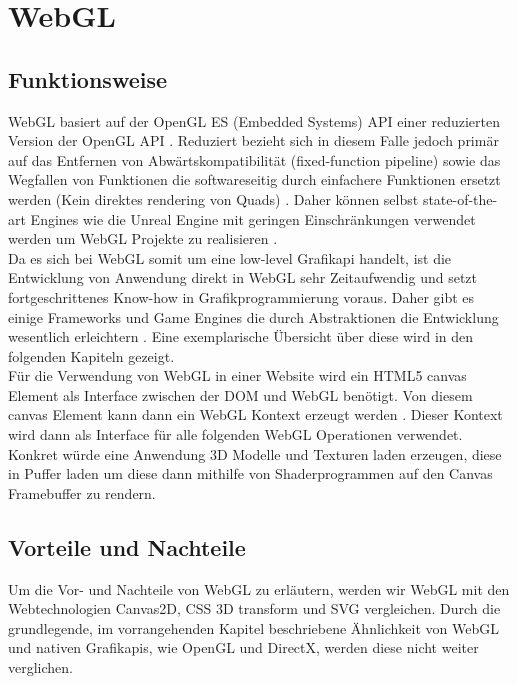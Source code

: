 \section{WebGL}
\subsection{Funktionsweise}
WebGL basiert auf der OpenGL ES (Embedded Systems) API \cite{parisi2012webgl} einer reduzierten Version der OpenGL API \cite{KhronosGLES}. Reduziert bezieht sich in diesem Falle jedoch primär auf das Entfernen von Abwärtskompatibilität (\zb fixed-function pipeline) sowie das Wegfallen von Funktionen die softwareseitig durch einfachere Funktionen ersetzt werden (\zb Kein direktes rendering von Quads) \cite{DiffGLES}. Daher können selbst state-of-the-art Engines wie die Unreal Engine mit geringen Einschränkungen verwendet werden um WebGL Projekte zu realisieren \cite{UnrealHTML5}\cite{UnrealLimits}. \\
Da es sich bei WebGL somit um eine low-level Grafikapi handelt, ist die Entwicklung von Anwendung direkt in WebGL sehr Zeitaufwendig und setzt fortgeschrittenes Know-how in Grafikprogrammierung voraus. Daher gibt es einige Frameworks und Game Engines die durch Abstraktionen die Entwicklung wesentlich erleichtern \cite{parisi2012webgl}. Eine exemplarische Übersicht über diese wird in den folgenden Kapiteln gezeigt. \\
Für die Verwendung von WebGL in einer Website wird ein HTML5 canvas Element als Interface zwischen der \ac{DOM} und WebGL benötigt. Von diesem canvas Element kann dann ein WebGL Kontext erzeugt werden \cite{parisi2012webgl}. Dieser Kontext wird dann als Interface für alle folgenden WebGL Operationen verwendet. Konkret würde eine Anwendung 3D Modelle und Texturen laden \bzw erzeugen, diese in Puffer laden um diese dann mithilfe von Shaderprogrammen auf den Canvas Framebuffer zu rendern. 
\subsection{Vorteile und Nachteile}
Um die Vor- und Nachteile von WebGL zu erläutern, werden wir WebGL mit den Webtechnologien Canvas2D, CSS 3D transform und SVG vergleichen. Durch die grundlegende, im vorrangehenden Kapitel beschriebene Ähnlichkeit von WebGL und nativen Grafikapis, wie OpenGL und DirectX, werden diese nicht weiter verglichen.

